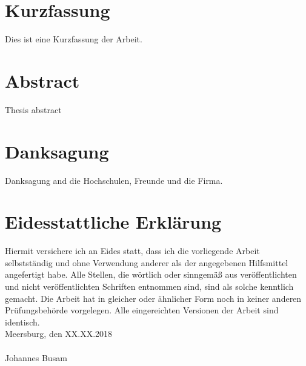 %
\section*{Kurzfassung}
Dies ist eine Kurzfassung der Arbeit.

\newpage
\section*{Abstract}
Thesis abstract
\newpage

\section*{Danksagung}
Danksagung and die Hochschulen, Freunde und die Firma.
\newpage

\section*{Eidesstattliche Erklärung}

Hiermit versichere ich an Eides statt, dass ich die vorliegende Arbeit selbstständig und
ohne Verwendung anderer als der angegebenen Hilfsmittel angefertigt habe. Alle Stellen,
die wörtlich oder sinngemäß aus veröffentlichten und nicht veröffentlichten Schriften
entnommen sind, sind als solche kenntlich gemacht. Die Arbeit hat in gleicher oder
ähnlicher Form noch in keiner anderen Prüfungsbehörde vorgelegen. Alle eingereichten
Versionen der Arbeit sind identisch.\\
\newline
\noindent
Meersburg, den XX.XX.2018 \\
\vspace{1.5cm} \\
Johannes Busam\newline

\newpage

